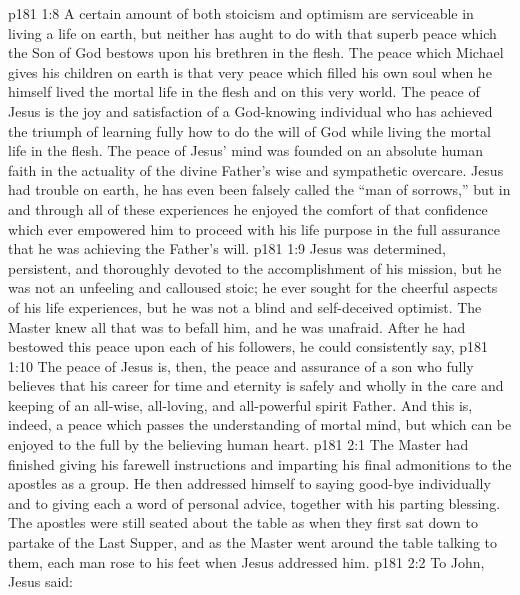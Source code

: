 \vs p181 1:8 A certain amount of both stoicism and optimism are serviceable in living a life on earth, but neither has aught to do with that superb peace which the Son of God bestows upon his brethren in the flesh. The peace which Michael gives his children on earth is that very peace which filled his own soul when he himself lived the mortal life in the flesh and on this very world. The peace of Jesus is the joy and satisfaction of a God\hyp{}knowing individual who has achieved the triumph of learning fully how to do the will of God while living the mortal life in the flesh. The peace of Jesus’ mind was founded on an absolute human faith in the actuality of the divine Father’s wise and sympathetic overcare. Jesus had trouble on earth, he has even been falsely called the “man of sorrows,” but in and through all of these experiences he enjoyed the comfort of that confidence which ever empowered him to proceed with his life purpose in the full assurance that he was achieving the Father’s will.
\vs p181 1:9 Jesus was determined, persistent, and thoroughly devoted to the accomplishment of his mission, but he was not an unfeeling and calloused stoic; he ever sought for the cheerful aspects of his life experiences, but he was not a blind and self\hyp{}deceived optimist. The Master knew all that was to befall him, and he was unafraid. After he had bestowed this peace upon each of his followers, he could consistently say, 
\vs p181 1:10 The peace of Jesus is, then, the peace and assurance of a son who fully believes that his career for time and eternity is safely and wholly in the care and keeping of an all\hyp{}wise, all\hyp{}loving, and all\hyp{}powerful spirit Father. And this is, indeed, a peace which passes the understanding of mortal mind, but which can be enjoyed to the full by the believing human heart.
\vs p181 2:1 The Master had finished giving his farewell instructions and imparting his final admonitions to the apostles as a group. He then addressed himself to saying good\hyp{}bye individually and to giving each a word of personal advice, together with his parting blessing. The apostles were still seated about the table as when they first sat down to partake of the Last Supper, and as the Master went around the table talking to them, each man rose to his feet when Jesus addressed him.
\vs p181 2:2 \pc To John, Jesus said: 
